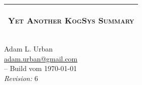 
\setlength{\parindent}{0 pt}
\pagestyle{empty}


\begin{center}
\begin{tabular}{c}
\hline
\begin{LARGE} \textsc{Yet Another KogSys Summary} \end{LARGE} \\ \hline
\end{tabular}
\end{center}

\vspace{1cm}


\vfill

\begin{center}
Adam L. Urban \\ \href{mailto:adam.urban@gmail.com}{adam.urban@gmail.com} \\ \LaTeXe -- Build vom \today \\ \textsl{Revision:} 6
\end{center}


\cleardoublepage

\pagestyle{headings}




